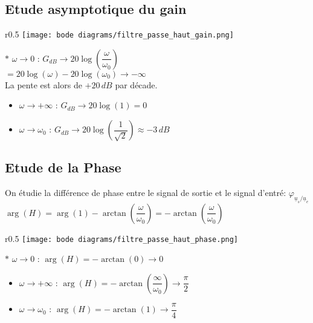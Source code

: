 \documentclass{article}
\begin{document}
\subsection{Etude asymptotique du gain}

\begin{wrapfigure}[5]{r}{0.5\textwidth}
    \centering
    \vspace{-2.5cm}
    \texttt{[image: bode diagrams/filtre\_passe\_haut\_gain.png]}
\end{wrapfigure}

    $\ast$ $\omega \rightarrow 0$ : $G_{dB} \rightarrow 20\log{\left( \dfrac{\omega}{\omega_0} \right)}$\\
    \indent $ = 20\log{(\omega)} - 20\log{(\omega_0)} \rightarrow -\infty$\\
    \indent La pente est alors de $+20\,dB$ par décade.
\begin{itemize}[label=$\ast$]
        \item $\omega \rightarrow +\infty$ : $G_{dB} \rightarrow 20\log{(1)} = 0$
    \item $\omega \rightarrow \omega_0$ : $G_{dB} \rightarrow 20\log{\left(\dfrac{1}{\sqrt{2}}\right)} \approx -3\,dB$
\end{itemize}   


\subsection{Etude de la Phase}

\noindent On étudie la différence de phase entre le signal de sortie et le signal d'entré: $\varphi_{\underline{u}_s/\underline{u}_e}$\\
$\arg{(H)} = \arg{(1)}-\arctan{\left( \dfrac{\omega}{\omega_0} \right)} = -\arctan{\left( \dfrac{\omega}{\omega_0} \right)}$

\begin{wrapfigure}[5]{r}{0.5\textwidth}
    \centering
    \vspace{-1cm}
    \texttt{[image: bode diagrams/filtre\_passe\_haut\_phase.png]}
\end{wrapfigure}

    $\ast$ $\omega \rightarrow 0$ : $\arg{(H)} = -\arctan{(0)} \rightarrow 0$
\begin{itemize}[label=$\ast$]
    \item $\omega \rightarrow +\infty$ : $\arg{(H)} = -\arctan{\left( \dfrac{\infty}{\omega_0} \right)} \rightarrow \dfrac{\pi}{2}$ 
    \item $\omega \rightarrow \omega_0$ : $\arg{(H)} = -\arctan{(1)} \rightarrow \dfrac{\pi}{4}$
\end{itemize}
\end{document}
